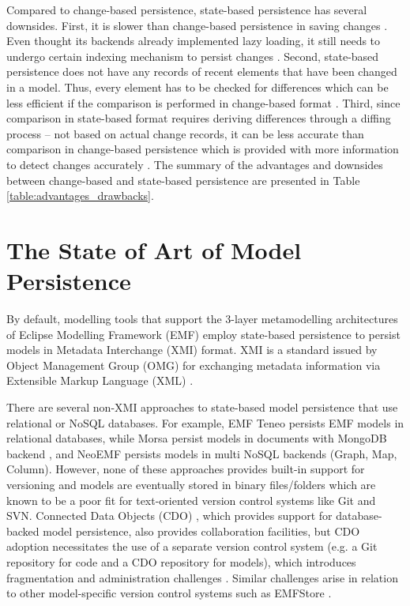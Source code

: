 Compared to change-based persistence, state-based persistence has several downsides. First, it is slower than change-based persistence in saving changes \cite{mens2002state}. Even thought its backends already implemented lazy loading, it still needs to undergo certain indexing mechanism to persist changes \cite{daniel2016neoemf,DBLP:conf/models/Espinazo-PaganCM11,eclipse2019cdo}. Second, state-based persistence does not have any records of recent elements that have been changed in a model. Thus, every element has to be checked for differences which can be less efficient if the comparison is performed in change-based format \cite{DBLP:conf/edoc/KoegelHLHD10}. Third, since comparison in state-based format requires deriving differences through a diffing process -- not based on actual change records, it can be less accurate than comparison in change-based persistence which is provided with more information to detect changes accurately \cite{mens2002state,DBLP:conf/edoc/KoegelHLHD10}. The summary of 
the advantages and downsides between change-based and state-based persistence are presented in
Table \ref{table:advantages_drawbacks}.

\section{The State of Art of Model Persistence}
\label{sec:the_state_of_art_of_model_persistence}
By default, modelling tools that support the 3-layer metamodelling architectures of Eclipse Modelling Framework (EMF) \cite{steinberg2008emf} employ state-based persistence to persist models in Metadata Interchange (XMI) format. XMI is a standard issued by Object Management Group (OMG) for exchanging metadata information via Extensible Markup Language (XML) \cite{omg2018xmi}. 

There are several non-XMI approaches to state-based model persistence that use relational or NoSQL databases. For example, EMF Teneo \cite{eclipse2017teneo} persists EMF models in relational databases, while Morsa \cite{DBLP:conf/models/Espinazo-PaganCM11} persist models in documents with MongoDB backend \cite{mongodb}, and NeoEMF \cite{daniel2016neoemf} persists models in multi NoSQL backends (Graph, Map, Column). However, none of these approaches provides built-in support for versioning and models are eventually stored in binary files/folders which are known to be a poor fit for text-oriented version control systems like Git and SVN. Connected Data Objects (CDO) \cite{eclipse2019cdo}, which provides support for database-backed model persistence, also provides collaboration facilities, but CDO adoption necessitates the use of a separate version control system (e.g. a Git repository for code and a CDO repository for models), which introduces fragmentation and administration challenges \cite{barmpis2014evaluation}. Similar challenges arise in relation to other model-specific version control systems such as EMFStore \cite{koegel2010emfstore}.

